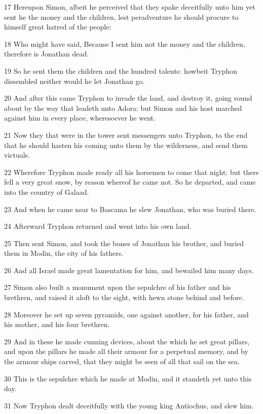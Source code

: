 \par 17 Hereupon Simon, albeit he perceived that they spake deceitfully unto him yet sent he the money and the children, lest peradventure he should procure to himself great hatred of the people:
\par 18 Who might have said, Because I sent him not the money and the children, therefore is Jonathan dead.
\par 19 So he sent them the children and the hundred talents: howbeit Tryphon dissembled neither would he let Jonathan go.
\par 20 And after this came Tryphon to invade the land, and destroy it, going round about by the way that leadeth unto Adora: but Simon and his host marched against him in every place, wheresoever he went.
\par 21 Now they that were in the tower sent messengers unto Tryphon, to the end that he should hasten his coming unto them by the wilderness, and send them victuals.
\par 22 Wherefore Tryphon made ready all his horsemen to come that night: but there fell a very great snow, by reason whereof he came not. So he departed, and came into the country of Galaad.
\par 23 And when he came near to Bascama he slew Jonathan, who was buried there.
\par 24 Afterward Tryphon returned and went into his own land.
\par 25 Then sent Simon, and took the bones of Jonathan his brother, and buried them in Modin, the city of his fathers.
\par 26 And all Israel made great lamentation for him, and bewailed him many days.
\par 27 Simon also built a monument upon the sepulchre of his father and his brethren, and raised it aloft to the sight, with hewn stone behind and before.
\par 28 Moreover he set up seven pyramids, one against another, for his father, and his mother, and his four brethren.
\par 29 And in these he made cunning devices, about the which he set great pillars, and upon the pillars he made all their armour for a perpetual memory, and by the armour ships carved, that they might be seen of all that sail on the sea.
\par 30 This is the sepulchre which he made at Modin, and it standeth yet unto this day.
\par 31 Now Tryphon dealt deceitfully with the young king Antiochus, and slew him.
